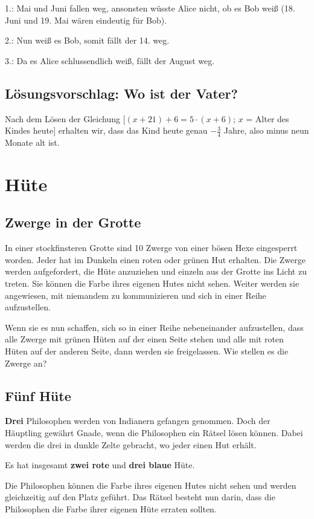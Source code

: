 {1.: Mai und Juni fallen weg, ansonsten wüsste Alice nicht, ob es Bob weiß (18.
Juni und 19. Mai wären eindeutig für Bob).

2.: Nun weiß es Bob, somit fällt der 14. weg.

3.: Da es Alice schlussendlich weiß, fällt der August weg.


\subsection{Lösungsvorschlag: Wo ist der Vater?}

Nach dem Lösen der Gleichung [$(x+21)+6 = 5·(x+6)$; $x$ = Alter des Kindes
heute] erhalten wir, dass das Kind heute genau $-\frac34$ Jahre, also minus neun
Monate alt ist.

}%
\newpage


\section{Hüte}
\subsection{Zwerge in der Grotte}
In einer stockfinsteren Grotte sind 10 Zwerge von einer bösen Hexe eingesperrt
worden. Jeder hat im Dunkeln einen roten oder grünen Hut erhalten. Die
Zwerge werden aufgefordert, die Hüte anzuziehen und einzeln aus der Grotte
ins Licht zu treten. Sie können die Farbe ihres eigenen Hutes nicht sehen.
Weiter werden sie angewiesen, mit niemandem zu kommunizieren und sich in
einer Reihe aufzustellen.

Wenn sie es nun schaffen, sich so in einer Reihe nebeneinander aufzustellen,
dass alle Zwerge mit grünen Hüten auf der einen Seite stehen und alle mit roten
Hüten auf der anderen Seite, dann werden sie freigelassen.
Wie stellen es die Zwerge an?


\subsection{Fünf Hüte}
\textbf{Drei} Philosophen werden von Indianern gefangen genommen. Doch der
Häuptling gewährt Gnade, wenn die Philosophen ein Rätsel lösen können. Dabei
werden die drei in dunkle Zelte gebracht, wo jeder einen Hut erhält.

Es hat insgesamt \textbf{zwei rote} und \textbf{drei blaue} Hüte.

Die Philosophen können die Farbe ihres eigenen Hutes nicht sehen und werden
gleichzeitig auf den Platz geführt. Das Rätsel besteht nun darin, dass die
Philosophen die Farbe ihrer eigenen Hüte erraten sollten.

